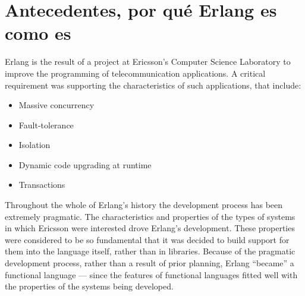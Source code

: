 \chapter{Antecedentes, por qué Erlang es como es}
\label{background}

Erlang is the result of a project at Ericsson's Computer Science Laboratory to
improve the programming of telecommunication applications.  A critical
requirement was supporting the characteristics of such applications, that include:

\begin{itemize}
\item Massive concurrency

\item Fault-tolerance

\item Isolation

\item Dynamic code upgrading at runtime

\item Transactions
\end{itemize}

Throughout the whole of Erlang's history the development process has
been extremely pragmatic. The characteristics and properties of the
types of systems in which Ericsson were interested drove Erlang's
development.  These properties were considered to be so
fundamental that it was decided to build support for them into the
language itself, rather than in libraries.  Because of the pragmatic development
process, rather than a result of prior planning, Erlang ``became'' a functional language --- since
the features of functional languages fitted well with the properties of the systems being developed.

